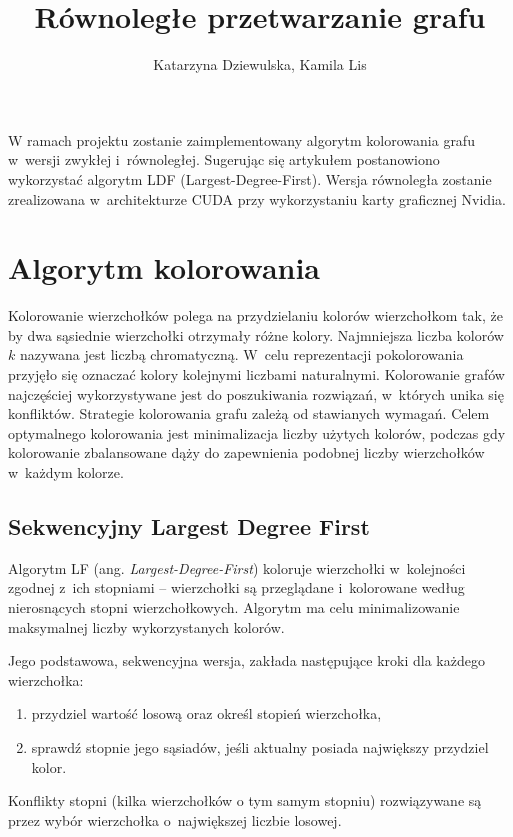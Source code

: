 \documentclass{article}
\date{}
\author{Katarzyna Dziewulska, Kamila Lis}
\title{Równoległe przetwarzanie grafu}
\begin{document}
	\maketitle
	W ramach projektu zostanie zaimplementowany algorytm kolorowania grafu w~wersji zwykłej i~równoległej. Sugerując się artykułem \cite{article} postanowiono wykorzystać algorytm LDF (Largest-Degree-First). Wersja równoległa zostanie zrealizowana w~architekturze CUDA przy wykorzystaniu karty graficznej Nvidia.\\
	
	\section{Algorytm kolorowania}
	Kolorowanie wierzchołków polega na  przydzielaniu kolorów wierzchołkom tak, że by dwa sąsiednie wierzchołki otrzymały różne kolory. Najmniejsza liczba kolorów $k$ nazywana jest liczbą chromatyczną. W~celu reprezentacji pokolorowania przyjęło się oznaczać kolory kolejnymi liczbami naturalnymi. Kolorowanie grafów najczęściej wykorzystywane jest do poszukiwania rozwiązań, w~których unika się konfliktów. Strategie kolorowania grafu zależą od stawianych wymagań. Celem optymalnego kolorowania jest minimalizacja liczby użytych kolorów, podczas gdy kolorowanie zbalansowane dąży do zapewnienia podobnej liczby wierzchołków w~każdym kolorze.
	\subsection{Sekwencyjny Largest Degree First}
	Algorytm LF (ang. \textit{Largest-Degree-First}) koloruje wierzchołki w~kolejności zgodnej z~ich stopniami -- wierzchołki są przeglądane i~kolorowane według nierosnących stopni wierzchołkowych. Algorytm ma celu minimalizowanie maksymalnej liczby wykorzystanych kolorów. 
	
	Jego podstawowa, sekwencyjna wersja, zakłada następujące kroki dla każdego wierzchołka:
	\begin{enumerate}
		\itemsep0em
		\item przydziel wartość losową oraz określ stopień  wierzchołka,
		\item sprawdź stopnie jego sąsiadów, jeśli aktualny posiada największy przydziel kolor.
	\end{enumerate}
	Konflikty stopni (kilka wierzchołków o tym samym stopniu) rozwiązywane są przez wybór wierzchołka o~największej liczbie losowej.
	
\end{document}

